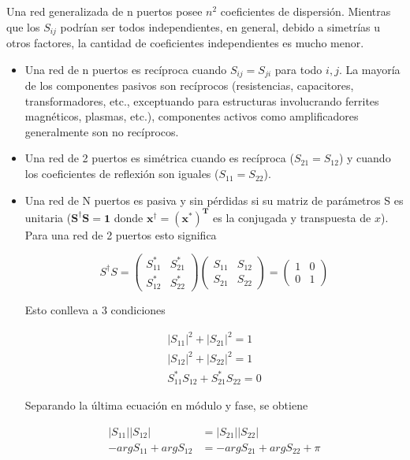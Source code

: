 Una red generalizada de n puertos posee $n^2$ coeficientes de dispersión. Mientras que los $S_{ij}$ podrían ser todos independientes,
en general, debido a simetrías u otros factores, la cantidad de coeficientes independientes es mucho menor.
\begin{itemize}
	\item Una red de n puertos es recíproca cuando $S_{ij} = S_{ji}$ para todo $i, j$. La mayoría de los componentes pasivos son
		recíprocos (resistencias, capacitores, transformadores, etc., exceptuando para estructuras involucrando ferrites magnéticos,
		plasmas, etc.), componentes activos como amplificadores generalmente son no recíprocos.
	\item Una red de 2 puertos es simétrica cuando es recíproca ($S_{21} = S_{12}$) y cuando los coeficientes de reflexión son iguales
		($S_{11} = S_{22}$).
	\item Una red de N puertos es pasiva y sin pérdidas si su matriz de parámetros S es unitaria ($\mathbf{S^{\dagger}S = 1}$ donde
		$\mathbf{x^{\dagger} = (x^*)^T}$ es la conjugada y transpuesta de $x$). Para una red de 2 puertos esto significa

\begin{equation}
S^{\dagger}S = \begin{pmatrix} S_{11}^* & S_{21}^*\\S_{12}^* & S_{22}^* \end{pmatrix}
			\begin{pmatrix} S_{11} & S_{12}\\S_{21} & S_{22} \end{pmatrix} = \begin{pmatrix} 1 & 0\\0 & 1 \end{pmatrix}
\end{equation}

Esto conlleva a 3 condiciones

\begin{equation}
\begin{aligned}
	|S_{11}|^2 + |S_{21}|^2 = 1 \\
	|S_{12}|^2 + |S_{22}|^2 = 1 \\
	S_{11}^*S_{12} + S_{21}^*S_{22} = 0
\end{aligned}
\label{eq:sCondition}
\end{equation}

Separando la última ecuación en módulo y fase, se obtiene

\begin{equation}
\begin{aligned}
	|S_{11}||S_{12}| &= |S_{21}||S_{22}| \\
	-argS_{11} + argS_{12} &= -argS_{21} + argS_{22} + \pi
\end{aligned}
\label{eq:con}
\end{equation}


\end{itemize}
